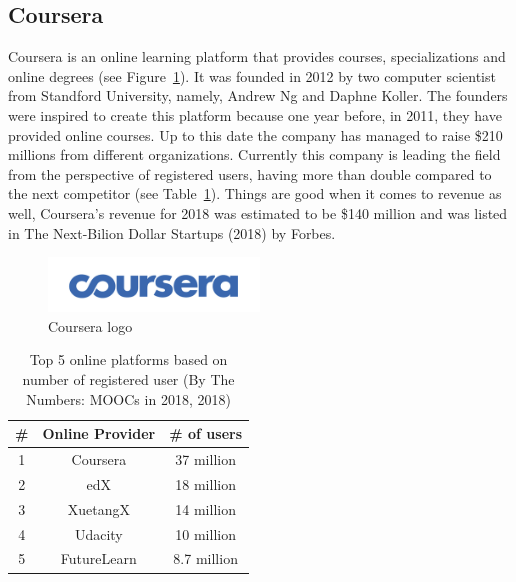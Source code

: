 \documentclass[11]{article}
\begin{document}
	\subsection{Coursera}
	Coursera is an online learning platform that provides courses, specializations and online degrees (see Figure~\ref{courseraLogo}). It was founded in 2012 by two computer scientist from Standford University, namely, Andrew Ng and Daphne Koller. The founders were inspired to create this platform because one year before, in 2011, they have provided online courses. Up to this date the company has managed to raise \$210 millions from different organizations. Currently this company is leading the field from the perspective of registered users, having more than double compared to the next competitor (see Table~\ref{top5}). Things are good when it comes to revenue as well, Coursera's revenue for 2018 was estimated to be \$140 million and was listed in The Next-Bilion Dollar Startups (2018) by Forbes.

\begin{figure}

	\begin{center}
		\includegraphics[width = 0.5\textwidth]{courseraLogo.png}
	\end{center}
	
	\caption{Coursera logo}
	\label{courseraLogo}

\end{figure}

\begin{table}[H]
	\centering
	\begin{tabular}{|c|c|c|}
		\hline
		\textbf{\#} & \textbf{Online Provider} & \textbf{\# of users} \\
		\hline
		1 & Coursera & 37 million \\
		\hline
		2 & edX      & 18 million \\
		\hline
		3 & XuetangX & 14 million \\
		\hline
		4 & Udacity & 10 million \\
		\hline
		5 & FutureLearn & 8.7 million \\
		\hline
	\end{tabular}

	\caption{Top 5 online platforms based on number of registered user (By The Numbers: MOOCs in 2018, 2018)}
	\label{top5}

\end{table}
\end{document}
